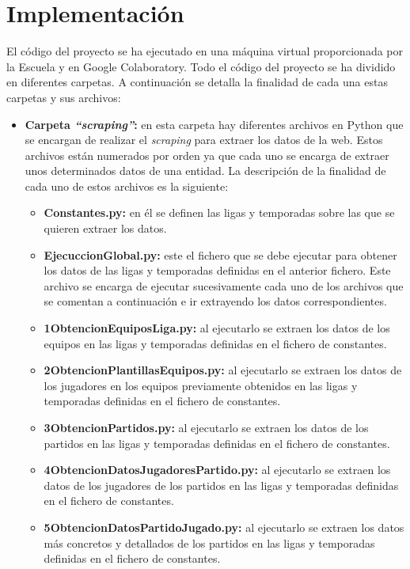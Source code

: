 \section{Implementación}
El código del proyecto se ha ejecutado en una máquina virtual proporcionada por la Escuela y en Google Colaboratory.
Todo el código del proyecto se ha dividido en diferentes carpetas. A continuación se detalla la finalidad de cada una estas carpetas y sus archivos:
\begin{itemize}
    \item \textbf{Carpeta \textit{``scraping''}:} en esta carpeta hay diferentes archivos en Python que se encargan de realizar el \textit{scraping} para extraer los datos de la web. Estos archivos están numerados por orden ya que cada uno se encarga de extraer unos determinados datos de una entidad. La descripción de la finalidad de cada uno de estos archivos es la siguiente:
          \begin{itemize}
              \item \textbf{Constantes.py:} en él se definen las ligas y temporadas sobre las que se quieren extraer los datos.
              \item \textbf{EjecuccionGlobal.py:} este el fichero que se debe ejecutar para obtener los datos de las ligas y temporadas definidas en el anterior fichero. Este archivo se encarga de ejecutar sucesivamente cada uno de los archivos que se comentan a continuación e ir extrayendo los datos correspondientes.
              \item \textbf{1ObtencionEquiposLiga.py:} al ejecutarlo se extraen los datos de los equipos en las ligas y temporadas definidas en el fichero de constantes.
              \item \textbf{2ObtencionPlantillasEquipos.py:} al ejecutarlo se extraen los datos de los jugadores en los equipos previamente obtenidos en las ligas y temporadas definidas en el fichero de constantes.
              \item \textbf{3ObtencionPartidos.py:} al ejecutarlo se extraen los datos de los partidos en las ligas y temporadas definidas en el fichero de constantes.
              \item \textbf{4ObtencionDatosJugadoresPartido.py:} al ejecutarlo se extraen los datos de los jugadores de los partidos en las ligas y temporadas definidas en el fichero de constantes.
              \item \textbf{5ObtencionDatosPartidoJugado.py:} al ejecutarlo se extraen los datos más concretos y detallados de los partidos en las ligas y temporadas definidas en el fichero de constantes.

\end{itemize}
\end{itemize}
